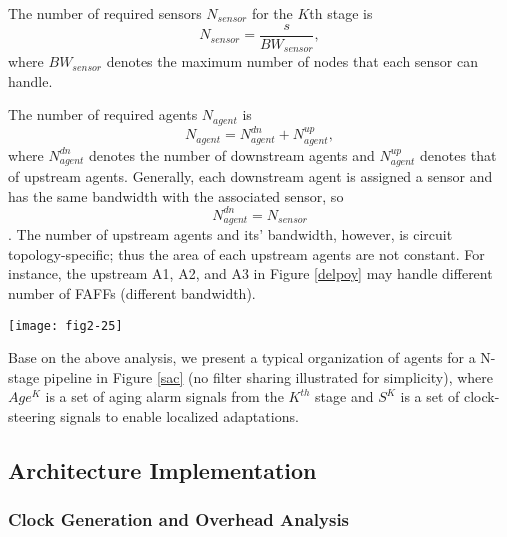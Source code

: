 The number of required sensors $N_{sensor}$ for the $K$th stage is
\begin{equation}\label{numsensor}
N_{sensor}=\frac{s}{BW_{sensor}},
\end{equation}
where $BW_{sensor}$ denotes the maximum number of nodes that each sensor can handle.

The number of required agents $N_{agent}$ is
\begin{equation}\label{numagent}
N_{agent}=N_{agent}^{dn}+N_{agent}^{up},
\end{equation}
where $N_{agent}^{dn}$ denotes the number of downstream agents and $N_{agent}^{up}$ denotes that of upstream agents. Generally, each downstream agent is assigned a sensor and has the same bandwidth with the associated sensor, so \begin{equation}N_{agent}^{dn}=N_{sensor}\end{equation}. The number of upstream agents and its' bandwidth, however, is circuit topology-specific; thus the area of each upstream agents are not constant. For instance, the upstream A1, A2, and A3 in Figure \ref{delpoy} may handle different number of FAFFs (different bandwidth).

\begin{figure*}[t]
\centering
\texttt{[image: fig2-25]}%
\vspace{-0.2cm}
   \caption{A group of synergistic agents for a n-stage pipeline}\label{sac}
\end{figure*}


Base on the above analysis, we present a typical organization of agents for a N-stage pipeline in Figure \ref{sac} (no filter sharing illustrated for simplicity), where $Age^K$ is a set of aging alarm signals from the $K^{th}$ stage and $S^K$ is a set of clock-steering signals to enable localized adaptations.

\subsection{Architecture Implementation}\label{imple_issue}

\subsubsection{Clock Generation and Overhead Analysis}\label{section_clcokgen}

